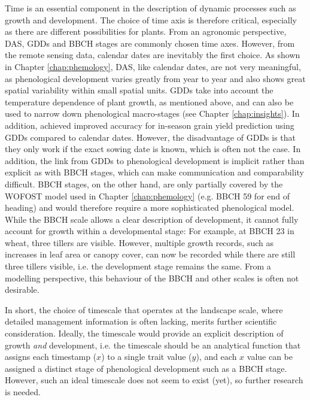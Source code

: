 Time is an essential component in the description of dynamic processes such as growth and development. The choice of time axis is therefore critical, especially as there are different possibilities for plants. From an agronomic perspective, \gls{DAS}, \gls{GDD}s and \gls{BBCH} stages are commonly chosen time axes. However, from the remote sensing data, calendar dates are inevitably the first choice. As shown in Chapter \ref{chap:phemology}, \gls{DAS}, like calendar dates, are not very meaningful, as phenological development varies greatly from year to year and also shows great spatial variability within small spatial units. \gls{GDD}s take into account the temperature dependence of plant growth, as mentioned above, and can also be used to narrow down phenological macro-stages (see Chapter \ref{chap:insights}). In addition, \cite{amin_-season_2024} achieved improved accuracy for in-season grain yield prediction using \gls{GDD}s compared to calendar dates. However, the disadvantage of \gls{GDD}s is that they only work if the exact sowing date is known, which is often not the case. In addition, the link from \gls{GDD}s to phenological development is implicit rather than explicit as with \gls{BBCH} stages, which can make communication and comparability difficult. \gls{BBCH} stages, on the other hand, are only partially covered by the \gls{WOFOST} model used in Chapter \ref{chap:phemology} (e.g. \gls{BBCH} 59 for end of heading) and would therefore require a more sophisticated phenological model. While the \gls{BBCH} scale allows a clear description of development, it cannot fully account for growth within a developmental stage: For example, at \gls{BBCH} 23 in wheat, three tillers are visible. However, multiple growth records, such as increases in leaf area or canopy cover, can now be recorded while there are still three tillers visible, i.e. the development stage remains the same. From a modelling perspective, this behaviour of the \gls{BBCH} and other scales is often not desirable.
 
In short, the choice of timescale that operates at the landscape scale, where detailed management information is often lacking, merits further scientific consideration. Ideally, the timescale would provide an explicit description of growth \textsl{and} development, i.e. the timescale should be an analytical function that assigns each timestamp ($x$) to a single trait value ($y$), and each $x$ value can be assigned a distinct stage of phenological development such as a \gls{BBCH} stage. However, such an ideal timescale does not seem to exist (yet), so further research is needed.

